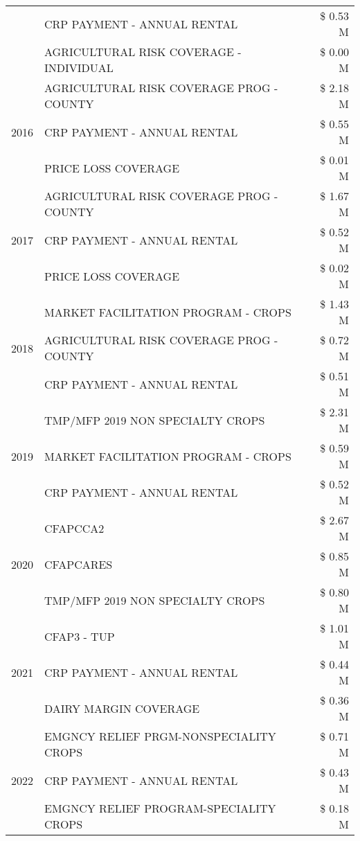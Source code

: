 \begin{tabular}{llr}
 & CRP PAYMENT - ANNUAL RENTAL & \$ 0.53 M \\
 & AGRICULTURAL RISK COVERAGE - INDIVIDUAL & \$ 0.00 M \\
\cline{1-3}
\multirow[t]{3}{*}{2016} & AGRICULTURAL RISK COVERAGE PROG - COUNTY & \$ 2.18 M \\
 & CRP PAYMENT - ANNUAL RENTAL & \$ 0.55 M \\
 & PRICE LOSS COVERAGE & \$ 0.01 M \\
\cline{1-3}
\multirow[t]{3}{*}{2017} & AGRICULTURAL RISK COVERAGE PROG - COUNTY & \$ 1.67 M \\
 & CRP PAYMENT - ANNUAL RENTAL & \$ 0.52 M \\
 & PRICE LOSS COVERAGE & \$ 0.02 M \\
\cline{1-3}
\multirow[t]{3}{*}{2018} & MARKET FACILITATION PROGRAM - CROPS & \$ 1.43 M \\
 & AGRICULTURAL RISK COVERAGE PROG - COUNTY & \$ 0.72 M \\
 & CRP PAYMENT - ANNUAL RENTAL & \$ 0.51 M \\
\cline{1-3}
\multirow[t]{3}{*}{2019} & TMP/MFP 2019 NON SPECIALTY CROPS & \$ 2.31 M \\
 & MARKET FACILITATION PROGRAM - CROPS & \$ 0.59 M \\
 & CRP PAYMENT - ANNUAL RENTAL & \$ 0.52 M \\
\cline{1-3}
\multirow[t]{3}{*}{2020} & CFAPCCA2 & \$ 2.67 M \\
 & CFAPCARES & \$ 0.85 M \\
 & TMP/MFP 2019 NON SPECIALTY CROPS & \$ 0.80 M \\
\cline{1-3}
\multirow[t]{3}{*}{2021} & CFAP3 - TUP & \$ 1.01 M \\
 & CRP PAYMENT - ANNUAL RENTAL & \$ 0.44 M \\
 & DAIRY MARGIN COVERAGE & \$ 0.36 M \\
\cline{1-3}
\multirow[t]{3}{*}{2022} & EMGNCY RELIEF PRGM-NONSPECIALITY CROPS & \$ 0.71 M \\
 & CRP PAYMENT - ANNUAL RENTAL & \$ 0.43 M \\
 & EMGNCY RELIEF PROGRAM-SPECIALITY CROPS & \$ 0.18 M \\
\cline{1-3}
\bottomrule
\end{tabular}
